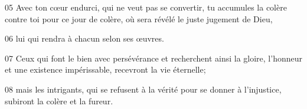 
05 Avec ton cœur endurci, qui ne veut pas se convertir, tu accumules la colère contre toi pour ce jour de colère, où sera révélé le juste jugement de Dieu,

06 lui qui rendra à chacun selon ses œuvres.

07 Ceux qui font le bien avec persévérance et recherchent ainsi la gloire, l’honneur et une existence impérissable, recevront la vie éternelle;

08 mais les intrigants, qui se refusent à la vérité pour se donner à l’injustice, subiront la colère et la fureur.
